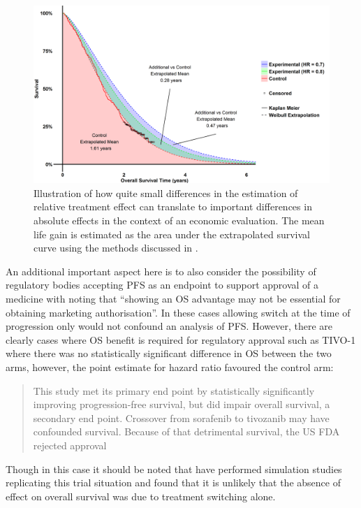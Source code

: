 \begin{figure}[ht]
\centering
\includegraphics[width=14cm]{images/chap_intro/intro_extrapol.png}
\caption{\label{F:chap_intro:extrapol} Illustration of how quite small differences in the estimation of relative treatment effect can translate to important differences in absolute effects in the context of an economic evaluation. The mean life gain is estimated as the area under the extrapolated survival curve using the methods discussed in \cite{TSD14}.} 
\end{figure}

An additional important aspect here is to also consider the possibility of regulatory bodies accepting PFS as an endpoint to support approval of a medicine with \cite{TSD16} noting that ``showing an OS advantage may not be essential for obtaining marketing authorisation''. In these cases allowing switch at the time of progression only would not confound an analysis of PFS. However, there are clearly cases where OS benefit is required for regulatory approval such as TIVO-1 \cite{TIVO1} where there was no statistically significant difference in OS between the two arms, however, the point estimate for hazard ratio favoured the control arm:
\begin{quote}
This study met its primary end point by statistically significantly improving progression-free survival, but did impair overall survival, a secondary end point. Crossover from sorafenib to tivozanib may have confounded survival. Because of that detrimental survival, the US FDA rejected approval
\end{quote}
Though in this case it should be noted that \cite{Slaets2013} have performed simulation studies replicating this trial situation and found that it is unlikely that the absence of effect on overall survival was due to treatment switching alone.


